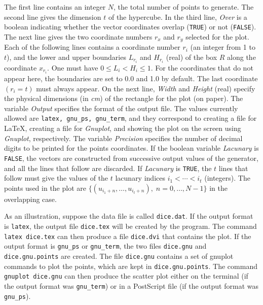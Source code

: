 The first line contains an integer $N$, the total number 
of points to generate.
The second line gives the dimension $t$ of the hypercube.
In the third line, {\it Over} is a boolean indicating whether 
the vector coordinates overlap ({\tt TRUE\/}) or not ({\tt FALSE\/}). 
The next line gives the two coordinate numbers $r_x$ and $r_y$ 
selected for the plot.
Each of the following lines contains a coordinate number $r_i$ (an integer
from 1 to $t$), and the lower and upper boundaries $L_{r_i}$ and $H_{r_i}$ 
(real) of the box $R$ along the coordinate $x_{r_i}$.
One must have $0 \le L_i < H_i \le 1$.
For the coordinates that do not appear here, the boundaries are set to
0.0 and 1.0 by default.  The last coordinate $(r_i=t)$ must always appear.
On the next line, {\it Width} and {\it Height} (real) 
specify the physical dimensions (in {\it cm}) 
of the rectangle for the plot (on paper).
The variable {\em Output\/} specifies the format of the output file.
The values currently allowed are {\tt latex, gnu\_ps, gnu\_term},
and they correspond to creating a file for \LaTeX, creating a file
for {\it Gnuplot}, and showing the plot on the screen using  {\it Gnuplot}, 
respectively. The variable {\em Precision\/} specifies the number of
decimal digits to be printed for the points coordinates.
If the boolean variable {\it Lacunary\/} is {\tt FALSE}, 
the vectors are constructed from successive output values of the 
generator, and all the lines that follow are discarded.
If {\it Lacunary\/} is {\tt TRUE}, the $t$ lines that follow must give the 
values of the $t$ lacunary indices $i_1 < \cdots < i_t$ (integers).
The points used in the plot are $\{(u_{i_1+n},\dots,u_{i_t+n}),\; 
n=0,\dots,N-1\}$ in the overlapping case.

As an illustration, suppose the data file is called {\tt dice.dat}. 
If the output format is {\tt latex}, the output file
 {\tt dice.tex} will be created by the program.
  The command {\tt latex dice.tex} can then produce a file
{\tt dice.dvi} that contains the plot.
If the output format is {\tt gnu\_ps} or {\tt gnu\_term}, 
the two files  {\tt dice.gnu} and {\tt dice.gnu.points} are
created.  The file {\tt dice.gnu} contains a set of gnuplot
commands to plot the points, which are kept in {\tt dice.gnu.points}. 
The command {\tt gnuplot dice.gnu} can then produce the scatter plot 
either on the terminal (if the output format was {\tt gnu\_term}) or 
in a PostScript file (if the output format was {\tt gnu\_ps}).



